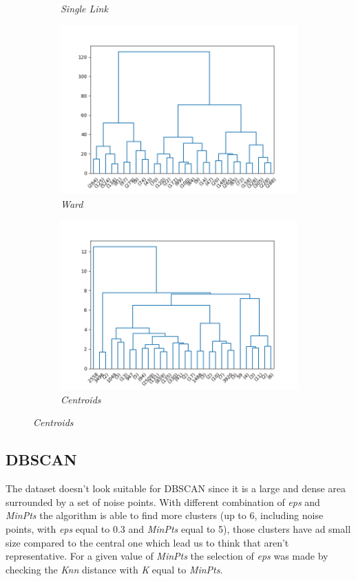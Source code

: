 \begin{figure}[h!]
\begin{subfigure}{0.49\textwidth}
        \caption{\emph{Single Link}}
        \label{fig:slink_img}
    \end{subfigure}
    \begin{subfigure}{0.49\textwidth}
        \centering
        \includegraphics[width=0.9\linewidth]{img/clust_1/ward.png}
        \caption{\emph{Ward}}
        \label{fig:ward_img}
    \end{subfigure}
    \begin{subfigure}{0.49\textwidth}
         \centering
         \includegraphics[width=0.9\linewidth]{img/clust_1/centroid.png}
         \caption{\emph{Centroids}}
         \label{fig:centr_img}
     \end{subfigure}
    \label{fig:dendograms}
\end{figure}

\subsection{DBSCAN}
The dataset doesn't look suitable for DBSCAN since it is a large and dense area surrounded by a set of noise points. With different combination of \emph{eps} and \emph{MinPts} the algorithm is able to find more clusters (up to 6, including noise points, with \emph{eps} equal to 0.3 and \emph{MinPts} equal to 5), those clusters have ad small size compared to the central one which lead us to think that aren't representative. For a given value of \emph{MinPts} the selection of \emph{eps} was made by checking the \emph{Knn} distance with \emph{K} equal to \emph{MinPts}.

